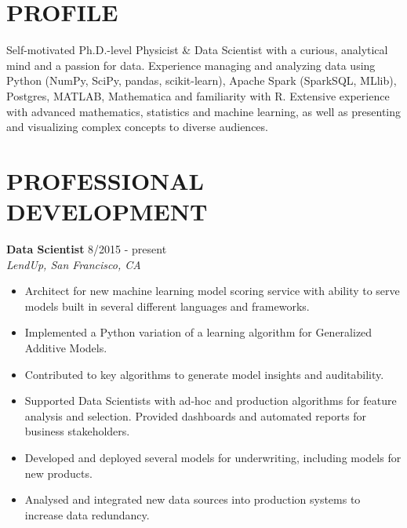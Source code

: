 \documentclass[10pt,centered]{./res} %
\begin{document}
\vspace*{-1.5cm}
\begin{resume}
\vspace{0.4cm}

\section{\color{ResumeBlue}PROFILE}
Self-motivated Ph.D.-level Physicist \& Data Scientist with a curious, analytical mind and a passion for data. Experience managing and analyzing data using Python (NumPy, SciPy, pandas, scikit-learn), Apache Spark (SparkSQL, MLlib), Postgres, MATLAB, {\sc Mathematica} and familiarity with R. Extensive experience with advanced mathematics, statistics and machine learning, as well as presenting and visualizing complex concepts to diverse audiences.

\section{\color{ResumeBlue}PROFESSIONAL DEVELOPMENT}
{\bf Data Scientist} \hfill8/2015 - present \\
{\it LendUp, San Francisco, CA}
\begin{itemize}
  \item Architect for new machine learning model scoring service with ability to serve models built in several different languages and frameworks.
  \item Implemented a Python variation of a learning algorithm for Generalized Additive Models.
  \item Contributed to key algorithms to generate model insights and auditability.
  \item Supported Data Scientists with ad-hoc and production algorithms for feature analysis and selection. Provided dashboards and automated reports for business stakeholders.
  \item Developed and deployed several models for underwriting, including models for new products.
  \item Analysed and integrated new data sources into production systems to increase data redundancy.
\end{itemize}


\end{resume}
\end{document}
